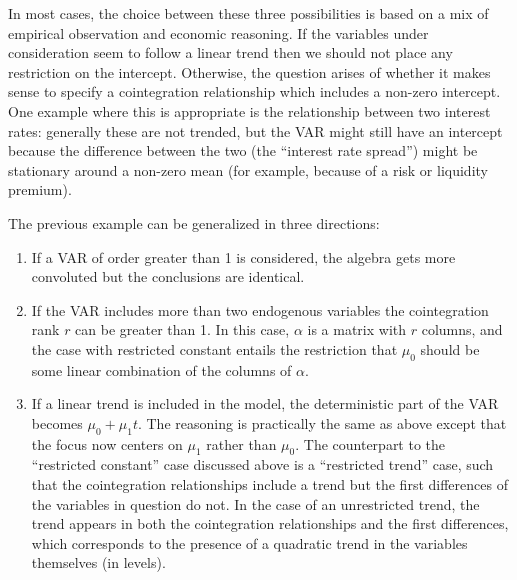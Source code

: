 In most cases, the choice between these three possibilities is based
on a mix of empirical observation and economic reasoning. If the
variables under consideration seem to follow a linear trend then we
should not place any restriction on the intercept. Otherwise, the
question arises of whether it makes sense to specify a cointegration
relationship which includes a non-zero intercept. One example where
this is appropriate is the relationship between two interest rates:
generally these are not trended, but the VAR might still have an
intercept because the difference between the two (the ``interest rate
spread'') might be stationary around a non-zero mean (for example,
because of a risk or liquidity premium).
    
The previous example can be generalized in three directions:
    
\begin{enumerate}
\item If a VAR of order greater than 1 is considered, the algebra gets
  more convoluted but the conclusions are identical.
\item If the VAR includes more than two endogenous variables the
  cointegration rank $r$ can be greater than 1. In this case, $\alpha$
  is a matrix with $r$ columns, and the case with restricted constant
  entails the restriction that $\mu_0$ should be some linear
  combination of the columns of $\alpha$.
\item If a linear trend is included in the model, the deterministic
  part of the VAR becomes $\mu_0 + \mu_1 t$. The reasoning is
  practically the same as above except that the focus now centers on
  $\mu_1$ rather than $\mu_0$.  The counterpart to the ``restricted
  constant'' case discussed above is a ``restricted trend'' case, such
  that the cointegration relationships include a trend but the first
  differences of the variables in question do not.  In the case of an
  unrestricted trend, the trend appears in both the cointegration
  relationships and the first differences, which corresponds to the
  presence of a quadratic trend in the variables themselves (in
  levels).
\end{enumerate}

